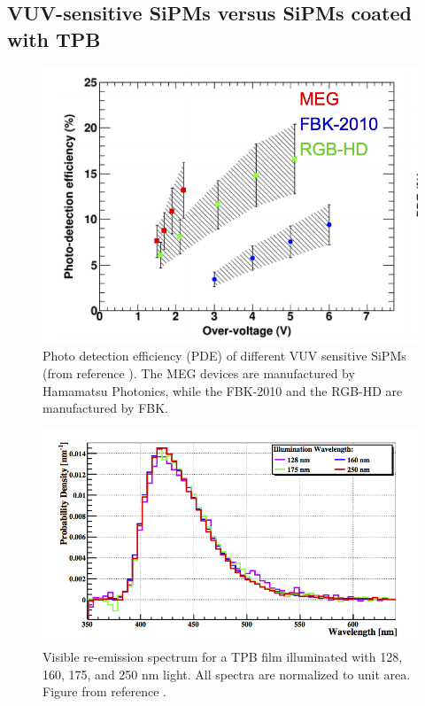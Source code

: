 \documentclass[review]{elsarticle}
\begin{document}
\subsection*{VUV-sensitive SiPMs versus SiPMs coated with TPB}

\begin{figure}[!htbp]
	\centering
	\includegraphics[scale=0.6]{../img/PDEVUV.png}
	\caption{Photo detection efficiency (PDE) of different VUV sensitive SiPMs
	(from reference \cite{vuv}). The MEG devices are
	manufactured by Hamamatsu Photonics, while the FBK-2010 and the RGB-HD
	are manufactured by FBK.  }\label{fig.vuv} 
\end{figure}

\begin{figure}[!htbp]
	\centering
	\includegraphics[scale=0.6]{../img/TPBSpectrum.png}
	\caption{Visible re-emission spectrum for a TPB film illuminated with 
	128, 160, 175, and 250 nm light. All spectra are normalized to unit area.
	Figure from reference \cite{Gehman:2011xm}.  }\label{fig.tpb} 
\end{figure}
\end{document}
